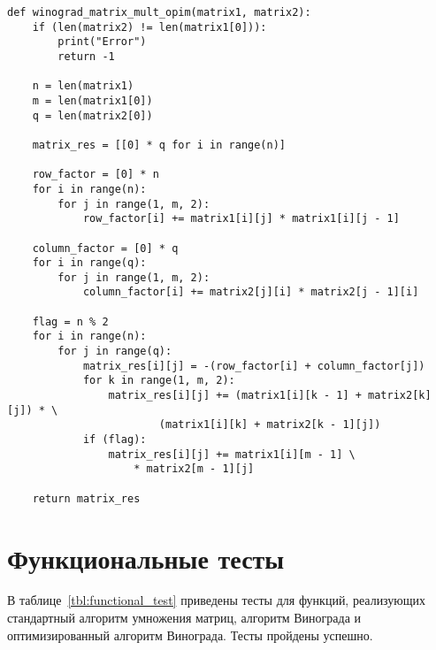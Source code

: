 \begin{lstlisting}[label=lst:vinograd_opt,caption=Реализация алгоритма Копперсмита-Винограда (оптимизированный)]
def winograd_matrix_mult_opim(matrix1, matrix2):
	if (len(matrix2) != len(matrix1[0])):
		print("Error")
		return -1
	
	n = len(matrix1)
	m = len(matrix1[0])
	q = len(matrix2[0])
	
	matrix_res = [[0] * q for i in range(n)]
	
	row_factor = [0] * n
	for i in range(n):
		for j in range(1, m, 2):
			row_factor[i] += matrix1[i][j] * matrix1[i][j - 1]
	
	column_factor = [0] * q
	for i in range(q):
		for j in range(1, m, 2):
			column_factor[i] += matrix2[j][i] * matrix2[j - 1][i]
	
	flag = n % 2
	for i in range(n):
		for j in range(q):
			matrix_res[i][j] = -(row_factor[i] + column_factor[j])
			for k in range(1, m, 2):
				matrix_res[i][j] += (matrix1[i][k - 1] + matrix2[k][j]) * \
						(matrix1[i][k] + matrix2[k - 1][j])
			if (flag):
				matrix_res[i][j] += matrix1[i][m - 1] \
					* matrix2[m - 1][j]

	return matrix_res
\end{lstlisting}


\section{Функциональные тесты}

В таблице~\ref{tbl:functional_test} приведены тесты для функций, реализующих стандартный алгоритм умножения матриц, алгоритм Винограда и оптимизированный алгоритм Винограда. Тесты пройдены успешно.

\clearpage

